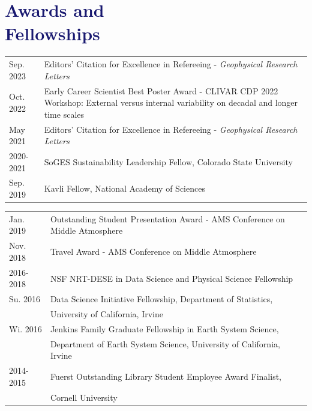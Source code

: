\documentclass[margin,line,palatino,courier,10pt]{res}
\begin{document}
\begin{resume}
\begin{etaremune}[leftmargin=0in,topsep=0in,parsep=0in]
\end{etaremune}

\vspace{-0.1in}
\noindent\textcolor{MidnightBlue}{\makebox[\linewidth][r]{\rule{\textwidth}{5pt}}}
\vspace{-0.3in}

\section{\sc \textcolor{MidnightBlue}{\large{\textbf{Awards and\\ Fellowships}}}}
\begin{tabular}{@{}p{0.9in}p{4in}}
Sep. 2023 & Editors' Citation for Excellence in Refereeing - \textit{Geophysical Research Letters}\\
Oct. 2022 & Early Career Scientist Best Poster Award - CLIVAR CDP 2022 Workshop: External versus internal variability on decadal and longer time scales\\
May 2021 & Editors' Citation for Excellence in Refereeing - \textit{Geophysical Research Letters}\\
2020-2021 & SoGES Sustainability Leadership Fellow, Colorado State University\\
Sep. 2019 & Kavli Fellow, National Academy of Sciences\\
\end{tabular}
\begin{tabular}{@{}p{0.9in}p{4in}}
Jan. 2019 & Outstanding Student Presentation Award - AMS Conference on Middle Atmosphere\\
Nov. 2018 & Travel Award - AMS Conference on Middle Atmosphere\\
2016-2018 & NSF NRT-DESE in Data Science and Physical Science Fellowship\\
Su. 2016 & Data Science Initiative Fellowship, Department of Statistics, \\
& University of California, Irvine\\
Wi. 2016 & Jenkins Family Graduate Fellowship in Earth System Science,\\ 
& Department of Earth System
Science, University of California, Irvine\\
2014-2015 & Fuerst Outstanding Library Student Employee Award Finalist,\\
& Cornell University
\end{tabular}


\end{resume}
\end{document}
